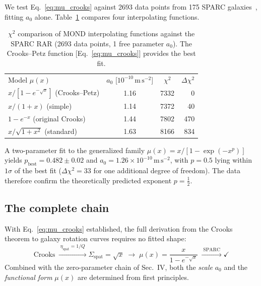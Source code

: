 \documentclass[prl,twocolumn,superscriptaddress,longbibliography]{revtex4-2}
\newcommand{\ms}{\,\mathrm{m\,s}^{-2}}
\newcommand{\azero}{a_0}
\begin{document}
We test Eq.~\eqref{eq:mu_crooks} against 2693 data points
from 175 SPARC galaxies~\cite{Lelli2017},
fitting $\azero$ alone.
Table~\ref{tab:sparc} compares four interpolating functions.

\begin{table}[t]
\caption{%
  $\chi^2$ comparison of MOND interpolating functions
  against the SPARC RAR (2693 data points, 1 free parameter $\azero$).
  The Crooks--Petz function [Eq.~\eqref{eq:mu_crooks}]
  provides the best fit.
}
\label{tab:sparc}
\begin{ruledtabular}
\begin{tabular}{lccr}
 Model $\mu(x)$ & $\azero$ [$10^{-10}\ms$]
   & $\chi^2$ & $\Delta\chi^2$ \\
\colrule
 $x/[1-e^{-\sqrt{x}}]$ (Crooks--Petz)
   & 1.16 & 7332 & 0 \\
 $x/(1+x)$ (simple)
   & 1.14 & 7372 & 40 \\
 $1-e^{-x}$ (original Crooks)
   & 1.44 & 7802 & 470 \\
 $x/\sqrt{1+x^2}$ (standard)
   & 1.63 & 8166 & 834 \\
\end{tabular}
\end{ruledtabular}
\end{table}

A two-parameter fit to the generalized family
$\mu(x) = x/[1 - \exp(-x^p)]$
yields $p_{\mathrm{best}} = 0.482 \pm 0.02$
and $\azero = 1.26 \times 10^{-10}\ms$,
with $p = 0.5$ lying within $1\sigma$ of the best fit
($\Delta\chi^2 = 33$ for one additional degree of freedom).
The data therefore confirm the theoretically predicted
exponent $p = \tfrac{1}{2}$.

\subsection{The complete chain}

With Eq.~\eqref{eq:mu_crooks} established, the full derivation
from the Crooks theorem to galaxy rotation curves requires
no fitted shape:
\begin{equation}
  \text{Crooks}
  \;\xrightarrow{\;\eta_{\mathrm{spat}}=1/Q\;}
  \Sigma_{\mathrm{spat}} = \sqrt{x}
  \;\longrightarrow\;
  \mu(x) = \frac{x}{1-e^{-\sqrt{x}}}
  \;\xrightarrow{\;\text{SPARC}\;}
  \checkmark
\end{equation}
Combined with the zero-parameter chain of
Sec.~IV, both the \textit{scale} $\azero$ and the
\textit{functional form} $\mu(x)$ are determined from
first principles.
\end{document}
